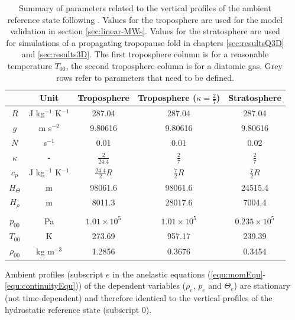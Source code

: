 \begin{table}[ht]
\centering
\caption{Summary of parameters related to the vertical profiles of the ambient reference state following \textcite[]{bacmeister_breakdown_1989}. Values for the troposphere are used for the model validation in section \ref{sec:linear-MWs}. Values for the stratosphere are used for simulations of a propagating tropopause fold in chapters \ref{sec:resultsQ3D} and \ref{sec:results3D}. The first troposphere column is for a reasonable temperature $T_{00}$, the second troposphere column is for a diatomic gas. Grey rows refer to parameters that need to be defined.}
\begin{tabular}{@{}ccccc@{}}
\toprule
 & Unit & Troposphere & Troposphere ($\kappa=\frac{2}{7}$) & Stratosphere \\ \midrule[1pt]

 \rowcolor{LightCyan} $R$ & J kg$^{-1}$ K$^{-1}$ &   \cellcolor{LightCyan} 287.04 &   \cellcolor{LightCyan} 287.04 &   \cellcolor{LightCyan} 287.04 \\
 \rowcolor{LightCyan} $g$ & m s$^{-2}$ & \cellcolor{LightCyan} 9.80616 & \cellcolor{LightCyan} 9.80616 & \cellcolor{LightCyan} 9.80616 \\
 \rowcolor{LightCyan} $N$ & s$^{-1}$ & \cellcolor{LightCyan} 0.01 & \cellcolor{LightCyan} 0.01 & \cellcolor{LightCyan} 0.02 \\
\rowcolor{LightCyan} $\kappa$ & - & $\frac{2}{24.4}$ & $ \frac{2}{7}$ & $ \frac{2}{7}$ \\
$c_p$ & J kg$^{-1}$ K$^{-1}$ & $\frac{24.4}{2} R$ & $\frac{7}{2} R$ & $\frac{7}{2} R$ \\
$H_{\Theta}$ & m & 98061.6 & 98061.6 & 24515.4  \\
$H_{\rho}$ & m & 8011.3  & 28017.6  & 7004.4 \\

& & & & \\
\rowcolor{LightCyan} $p_{00}$ & Pa & \cellcolor{LightCyan} $1.01 \times 10^5$ & \cellcolor{LightCyan} $1.01 \times 10^5$ & \cellcolor{LightCyan} $0.235 \times 10^5$ \\
$T_{00}$ & K & 273.69 & 957.17 & 239.39 \\
$\rho_{00}$ & kg m$^{-3}$ & 1.2856 & 0.3676 & 0.3454 \\

\bottomrule
\end{tabular}
\label{tab:ambientProfiles}
\end{table}

Ambient profiles (subscript $e$ in the anelastic equations (\ref{equ:momEqu}-\ref{equ:continuityEqu})) of the dependent variables ($\rho_e$, $p_e$ and $\Theta_e$) are stationary (not time-dependent) and therefore identical to the vertical profiles of the hydrostatic reference state (subscript 0).

